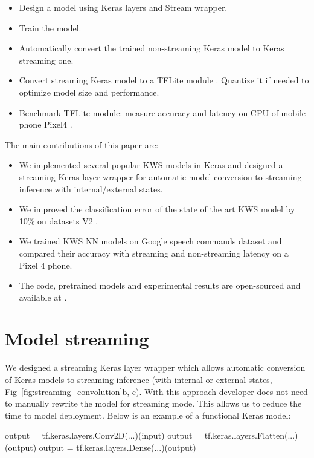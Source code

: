 \documentclass[a4paper]{article}
\begin{document}
\begin{itemize}[noitemsep]
\item Design a model using Keras layers and Stream wrapper.
\item Train the model.
\item Automatically convert the trained non-streaming Keras model to Keras streaming one.
\item Convert streaming Keras model to a TFLite module \cite{TFLITE}. Quantize it if needed to optimize model size and performance.
\item Benchmark TFLite module: measure accuracy and latency on CPU of mobile phone Pixel4 \cite{PIXEL4}.
\end{itemize}


\noindent The main contributions of this paper are:

\begin{itemize}[noitemsep]
\item We implemented several popular KWS models in Keras and designed a streaming Keras layer wrapper for automatic model conversion to streaming inference with internal/external states.
\item We improved the classification error of the state of the art KWS model by 10\% on datasets V2 \cite{DATA2}.
\item We trained KWS NN models on Google speech commands dataset \cite{DATA} and compared their accuracy with streaming and non-streaming latency on a Pixel 4 phone.
\item The code, pretrained models and experimental results are open-sourced and available at \cite{OPEN}.
\end{itemize}

\section{Model streaming}

We designed a streaming Keras layer wrapper which allows automatic conversion of Keras models to streaming inference (with internal or external states, Fig~\ref{fig:streaming_convolution}b, c). With this approach developer does not need to manually rewrite the model for streaming mode. This allows us to reduce the time to model deployment. Below is an example of a functional Keras model:

\begin{verbnobox}[\fontsize{7pt}{7pt}\selectfont]
output = tf.keras.layers.Conv2D(...)(input)
output = tf.keras.layers.Flatten(...)(output)
output = tf.keras.layers.Dense(...)(output)
\end{verbnobox}
\end{document}
